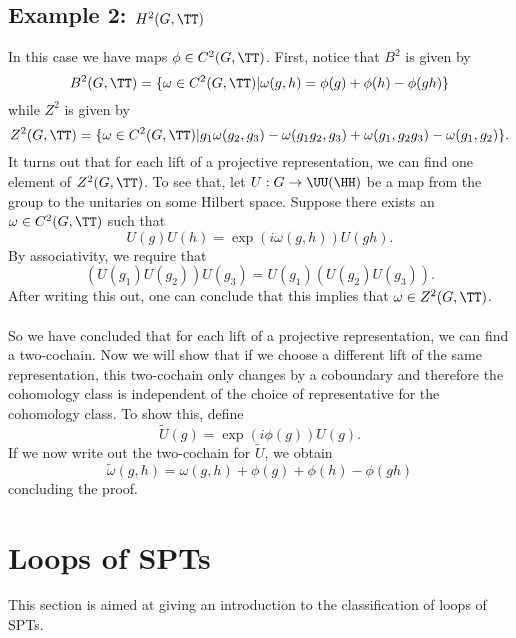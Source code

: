 \subsection{Example 2: \texorpdfstring{$H^2(G,\TT)$}{H2}}\label{sec:example-2-h2gtt}
In this case we have maps $\phi\in C^2(G,\TT)$. First, notice that $B^2$ is given by
\begin{equation}
B^2(G,\TT)=\{\omega\in C^2(G,\TT)|\omega(g,h)=\phi(g)+\phi(h)-\phi(gh)\}
\end{equation}
while $Z^2$ is given by
\begin{equation}
Z^2(G,\TT)=\{\omega\in C^2(G,\TT)|g_1\omega(g_2,g_3)-\omega(g_1g_2,g_3)+\omega(g_1,g_2g_3)-\omega(g_1,g_2)\}. 
\end{equation}
It turns out that for each lift of a projective representation, we can find one element of $Z^2(G,\TT)$. To see that, let $U:G\rightarrow\UU(\HH)$ be a map from the group to the unitaries on some Hilbert space. Suppose there exists an $\omega\in C^2(G,\TT)$ such that
\begin{equation}
U(g)U(h)=\exp(i\omega(g,h))U(gh).
\end{equation}
By associativity, we require that
\begin{equation}
(U(g_1)U(g_2))U(g_3)=U(g_1)(U(g_2)U(g_3)).
\end{equation}
After writing this out, one can conclude that this implies that $\omega\in Z^2(G,\TT)$.\\\\
So we have concluded that for each lift of a projective representation, we can find a two-cochain. Now we will show that if we choose a different lift of the same representation, this two-cochain only changes by a coboundary and therefore the cohomology class is independent of the choice of representative for the cohomology class. To show this, define
\begin{equation}
\tilde{U}(g)=\exp(i \phi(g))U(g).
\end{equation}
If we now write out the two-cochain for $\tilde{U}$, we obtain
\begin{equation}
\tilde{\omega}(g,h)=\omega(g,h)+\phi(g)+\phi(h)-\phi(gh)
\end{equation}
concluding the proof.
\section{Loops of SPTs}\label{sec:loops-of-spts}
This section is aimed at giving an introduction to the classification of loops of SPTs.
